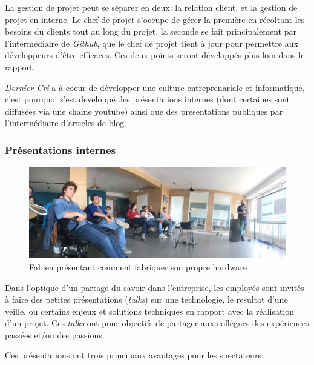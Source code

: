 \bigskip

La gestion de projet peut se séparer en deux: la relation client, et la
gestion de projet en interne. Le chef de projet s'occupe de gérer la
première en récoltant les besoins du clients tout au long du projet, la
seconde se fait principalement par l'intermédiaire de \emph{Github}, que
le chef de projet tient à jour pour permettre aux développeurs d'être
efficaces. Ces deux points seront développés plus loin dans le rapport.

\bigskip

\emph{Dernier Cri} a à coeur de développer une culture entreprenariale
et informatique, c'est pourquoi s'est developpé des présentations
internes (dont certaines sont diffusées via une chaine youtube) ainsi
que des présentations publiques par l'intermédiaire d'articles de blog.

\subsubsection{Présentations internes}\label{pruxe9sentations-internes}

\begin{figure}[h]
  \centering
  \includegraphics[height=4cm]{figures/talk.jpg}
  \caption{Fabien présentant comment fabriquer son propre hardware}
\end{figure}

\bigskip

Dans l'optique d'un partage du savoir dans l'entreprise, les employés
sont invités à faire des petites présentations (\emph{talks}) sur une
technologie, le resultat d'une veille, ou certains enjeux et solutions
techniques en rapport avec la réalisation d'un projet. Ces \emph{talks}
ont pour objectifs de partager aux collègues des expériences passées
et/ou des passions.

\bigskip

Ces présentations ont trois principaux avantages pour les spectateurs:

